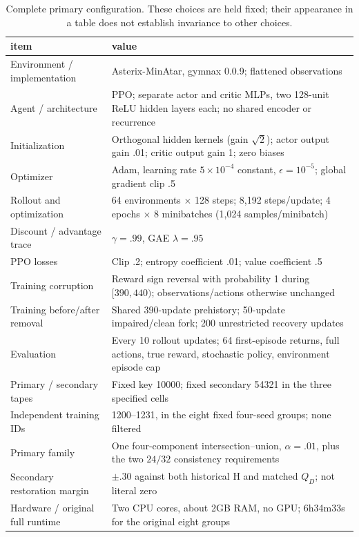 \begin{table}[ht]
\centering
\caption{Complete primary configuration. These choices are held fixed; their appearance in a table does not establish invariance to other choices.}
\label{app:configuration}
\small
\begin{tabularx}{\linewidth}{@{}>{\raggedright\arraybackslash}p{5.0cm}X@{}}
\toprule
item & value \\
\midrule
Environment / implementation & Asterix-MinAtar, gymnax 0.0.9; flattened observations \\
Agent / architecture & PPO; separate actor and critic MLPs, two 128-unit ReLU hidden layers each; no shared encoder or recurrence \\
Initialization & Orthogonal hidden kernels (gain $\sqrt2$); actor output gain .01; critic output gain 1; zero biases \\
Optimizer & Adam, learning rate $5\times10^{-4}$ constant, $\epsilon=10^{-5}$; global gradient clip .5 \\
Rollout and optimization & 64 environments $\times$ 128 steps; 8{,}192 steps/update; 4 epochs $\times$ 8 minibatches (1{,}024 samples/minibatch) \\
Discount / advantage trace & $\gamma=.99$, GAE $\lambda=.95$ \\
PPO losses & Clip .2; entropy coefficient .01; value coefficient .5 \\
Training corruption & Reward sign reversal with probability 1 during $[390,440)$; observations/actions otherwise unchanged \\
Training before/after removal & Shared 390-update prehistory; 50-update impaired/clean fork; 200 unrestricted recovery updates \\
Evaluation & Every 10 rollout updates; 64 first-episode returns, full actions, true reward, stochastic policy, environment episode cap \\
Primary / secondary tapes & Fixed key 10000; fixed secondary 54321 in the three specified cells \\
Independent training IDs & 1200--1231, in the eight fixed four-seed groups; none filtered \\
Primary family & One four-component intersection--union, $\alpha=.01$, plus the two $24/32$ consistency requirements \\
Secondary restoration margin & $\pm.30$ against both historical H and matched $Q_D$; not literal zero \\
Hardware / original full runtime & Two CPU cores, about 2GB RAM, no GPU; 6h34m33s for the original eight groups \\
\bottomrule
\end{tabularx}
\end{table}

